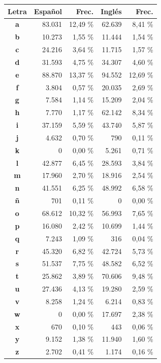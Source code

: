 \documentclass[12pt,a4paper,twoside]{book}
\begin{document}
\begin{center}
\begin{longtable}{|c|r|r|r|r|}
\hline
\textbf{Letra} & \textbf{Español} & \textbf{Frec.} & \textbf{Inglés} & \textbf{Frec.} \\ \hline
\textbf{a} & 83.031 & 12,49 \% & 62.639 & 8,41 \% \\ \hline
\textbf{b} & 10.273 & 1,55 \% & 11.444 & 1,54 \% \\ \hline
\textbf{c} & 24.216 & 3,64 \% & 11.715 & 1,57 \% \\ \hline
\textbf{d} & 31.593 & 4,75 \% & 34.307 & 4,60 \% \\ \hline
\textbf{e} & 88.870 & 13,37 \% & 94.552 & 12,69 \% \\ \hline
\textbf{f} & 3.804 & 0,57 \% & 20.035 & 2,69 \% \\ \hline
\textbf{g} & 7.584 & 1,14 \% & 15.209 & 2,04 \% \\ \hline
\textbf{h} & 7.770 & 1,17 \% & 62.142 & 8,34 \% \\ \hline
\textbf{i} & 37.159 & 5,59 \% & 43.740 & 5,87 \% \\ \hline
\textbf{j} & 4.632 & 0,70 \% & 790 & 0,11 \% \\ \hline
\textbf{k} & 0 & 0,00 \% & 5.261 & 0,71 \% \\ \hline
\textbf{l} & 42.877 & 6,45 \% & 28.593 & 3,84 \% \\ \hline
\textbf{m} & 17.960 & 2,70 \% & 18.916 & 2,54 \% \\ \hline
\textbf{n} & 41.551 & 6,25 \% & 48.992 & 6,58 \% \\ \hline
\textbf{ñ} & 701 & 0,11 \% & 0 & 0,00 \% \\ \hline
\textbf{o} & 68.612 & 10,32 \% & 56.993 & 7,65 \% \\ \hline
\textbf{p} & 16.080 & 2,42 \% & 10.699 & 1,44 \% \\ \hline
\textbf{q} & 7.243 & 1,09 \% & 316 & 0,04 \% \\ \hline
\textbf{r} & 45.320 & 6,82 \% & 42.724 & 5,73 \% \\ \hline
\textbf{s} & 51.537 & 7,75 \% & 48.582 & 6,52 \% \\ \hline
\textbf{t} & 25.862 & 3,89 \% & 70.606 & 9,48 \% \\ \hline
\textbf{u} & 27.436 & 4,13 \% & 19.280 & 2,59 \% \\ \hline
\textbf{v} & 8.258 & 1,24 \% & 6.214 & 0,83 \% \\ \hline
\textbf{w} & 0 & 0,00 \% & 17.697 & 2,38 \% \\ \hline
\textbf{x} & 670 & 0,10 \% & 443 & 0,06 \% \\ \hline
\textbf{y} & 9.152 & 1,38 \% & 11.940 & 1,60 \% \\ \hline
\textbf{z} & 2.702 & 0,41 \% & 1.174 & 0,16 \% \\ \hline
\end{longtable}
\end{center}
\end{document}
